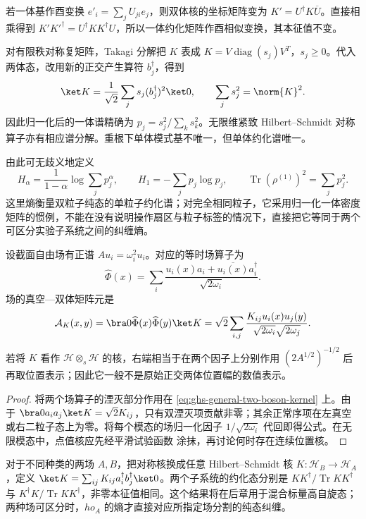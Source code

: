 若一体基作酉变换 $e'_i=\sum_jU_{ji}e_j$，则双体核的坐标矩阵变为 $K'=U^\dagger K\overline U$。直接相乘得到 $K'K'^\dagger=U^\dagger KK^\dagger U$，所以一体约化矩阵作酉相似变换，其本征值不变。

对有限秩对称复矩阵，Takagi 分解把 $K$ 表成 $K=V\operatorname{diag}(s_j)V^T$，$s_j\geq0$。代入两体态，改用新的正交产生算符 $b_j^\dagger$，得到
\begin{equation}\label{eq:ghs-takagi-two-boson}
 \ket K=\frac1{\sqrt2}\sum_j s_j(b_j^\dagger)^2\ket0,\qquad
 \sum_js_j^2=\norm{K}^2.
\end{equation}
因此归一化后的一体谱精确为 $p_j=s_j^2/\sum_ks_k^2$。无限维紧致 Hilbert--Schmidt 对称算子亦有相应谱分解。重根下单体模式基不唯一，但单体约化谱唯一。

由此可无歧义地定义
\begin{equation}\label{eq:ghs-general-two-body-renyi}
 H_\alpha=\frac1{1-\alpha}\log\sum_jp_j^\alpha,\qquad
 H_1=-\sum_jp_j\log p_j,\qquad
 \operatorname{Tr}(\rho^{(1)})^2=\sum_jp_j^2.
\end{equation}
这里熵衡量双粒子纯态的单粒子约化谱；对完全相同粒子，它采用归一化一体密度矩阵的惯例，不能在没有说明操作扇区与粒子标签的情况下，直接把它等同于两个可区分实验子系统之间的纠缠熵。


设截面自由场有正谱 $A u_i=\omega_i^2u_i$。对应的等时场算子为
\[
 \widehat\Phi(x)=\sum_i\frac{u_i(x)a_i+\overline{u_i(x)}a_i^\dagger}{\sqrt{2\omega_i}}.
\]
场的真空—双体矩阵元是
\begin{equation}\label{eq:ghs-general-two-body-field-amplitude}
 \mathcal A_K(x,y)=\bra0\widehat\Phi(x)\widehat\Phi(y)\ket K
 =\sqrt2\sum_{i,j}\frac{K_{ij}u_i(x)u_j(y)}{\sqrt{2\omega_i}\sqrt{2\omega_j}}.
\end{equation}
若将 $K$ 看作 $\mathscr H\otimes_s\mathscr H$ 的核，右端相当于在两个因子上分别作用 $(2A^{1/2})^{-1/2}$ 后再取位置表示；因此它一般不是原始正交两体位置幅的数值表示。

\begin{proof}
将两个场算子的湮灭部分作用在 \cref{eq:ghs-general-two-boson-kernel} 上。由于
$\bra0 a_i a_j\ket K=\sqrt2K_{ij}$，只有双湮灭项贡献非零；其余正常序项在左真空或右二粒子态上为零。将每个模态的场归一化因子 $1/\sqrt{2\omega_i}$ 代回即得公式。在无限模态中，点值核应先经平滑试验函数 涂抹，再讨论何时存在连续位置核。
\end{proof}

对于不同种类的两场 $A,B$，把对称核换成任意 Hilbert--Schmidt 核 $K:\mathscr H_B\to\mathscr H_A$，定义 $\ket K=\sum_{ij}K_{ij}a_i^\dagger b_j^\dagger\ket0$。两个子系统的约化态分别是 $KK^\dagger/\operatorname{Tr}KK^\dagger$ 与 $K^\dagger K/\operatorname{Tr}KK^\dagger$，非零本征值相同。这个结果将在后章用于混合标量高自旋态；两种场可区分时，$
ho_A$ 的熵才直接对应所指定场分割的纯态纠缠。


